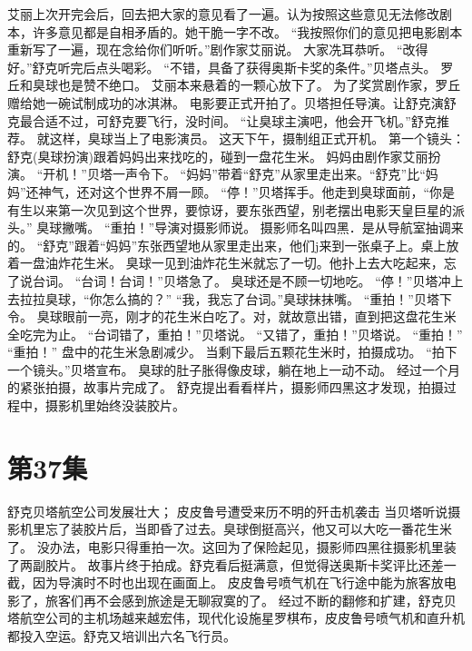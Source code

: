 \documentclass[a4paper,12pt,UTF8,twoside]{ctexbook}
\begin{document}
        艾丽上次开完会后，回去把大家的意见看了一遍。认为按照这些意见无法修改剧本，许多意见都是自相矛盾的。她干脆一字不改。 
        “我按照你们的意见把电影剧本重新写了一遍，现在念给你们听听。”剧作家艾丽说。 
        大家冼耳恭听。 
        “改得好。”舒克听完后点头喝彩。 
        “不错，具备了获得奥斯卡奖的条件。”贝塔点头。 
        罗丘和臭球也是赞不绝口。 
        艾丽本来悬着的一颗心放下了。 
        为了奖赏剧作家，罗丘赠给她一碗试制成功的冰淇淋。 
        电影要正式开拍了。贝塔担任导演。让舒克演舒克最合适不过，可舒克要飞行，没时间。 
        “让臭球主演吧，他会开飞机。”舒克推荐。 
        就这样，臭球当上了电影演员。 
        这天下午，摄制组正式开机。 
        第一个镜头：舒克(臭球扮演)跟着妈妈出来找吃的，碰到一盘花生米。 
        妈妈由剧作家艾丽扮演。 
        “开机！”贝塔一声令下。 
        “妈妈”带着“舒克”从家里走出来。“舒克”比“妈妈”还神气，还对这个世界不屑一顾。 
        “停！”贝塔挥手。他走到臭球面前，“你是有生以来第一次见到这个世界，要惊讶，要东张西望，别老摆出电影天皇巨星的派头。” 
        臭球撇嘴。 
        “重拍！”导演对摄影师说。 
        摄影师名叫四黑．是从导航室抽调来的。 
        “舒克”跟着“妈妈”东张西望地从家里走出来，他们j来到一张桌子上。桌上放着一盘油炸花生米。 
        臭球一见到油炸花生米就忘了一切。他扑上去大吃起来，忘了说台词。 
        “台词！台词！”贝塔急了。 
        臭球还是不顾一切地吃。 
        “停！”贝塔冲上去拉拉臭球，“你怎么搞的？” 
        “我，我忘了台词。”臭球抹抹嘴。 
        “重拍！”贝塔下令。 
        臭球眼前一亮，刚才的花生米白吃了。对，就故意出错，直到把这盘花生米全吃完为止。 
        “台词错了，重拍！”贝塔说。 
        “又错了，重拍！”贝塔说。 
        “重拍！” 
        “重拍！” 
        盘中的花生米急剧减少。 
        当剩下最后五颗花生米时，拍摄成功。 
        “拍下一个镜头。”贝塔宣布。 
        臭球的肚子胀得像皮球，躺在地上一动不动。 
        经过一个月的紧张拍摄，故事片完成了。 
        舒克提出看看样片，摄影师四黑这才发现，拍摄过程中，摄影机里始终没装胶片。   \chapter{第37集} 
        舒克贝塔航空公司发展壮大； 
        皮皮鲁号遭受来历不明的歼击机袭击   
        当贝塔听说摄影机里忘了装胶片后，当即昏了过去。臭球倒挺高兴，他又可以大吃一番花生米了。 
        没办法，电影只得重拍一次。这回为了保险起见，摄影师四黑往摄影机里装了两副胶片。 
        故事片终于拍成。舒克看后挺满意，但觉得送奥斯卡奖评比还差一截，因为导演时不时也出现在画面上。 
        皮皮鲁号喷气机在飞行途中能为旅客放电影了，旅客们再不会感到旅途是无聊寂寞的了。 
        经过不断的翻修和扩建，舒克贝塔航空公司的主机场越来越宏伟，现代化设施星罗棋布，皮皮鲁号喷气机和直升机都投入空运。舒克又培训出六名飞行员。 
\end{document}
